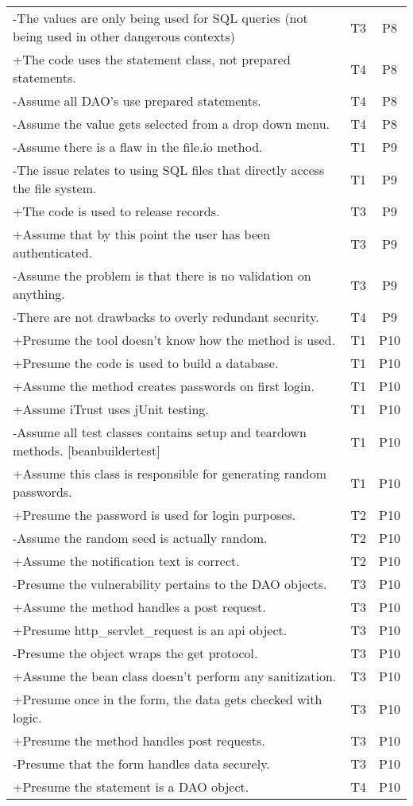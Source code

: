 \documentclass[10pt,journal,compsoc]{IEEEtran}
\begin{document}
\begin{table*}
\begin{tabularx}{\textwidth}{|X|c|c|}
		-The values are only being used for SQL queries (not being used in other dangerous contexts)	&	T3	&	P8	\\
		+The code uses the statement class, not prepared statements.	&	T4	&	P8	\\
		-Assume all DAO’s use prepared statements.	&	T4	&	P8	\\
		-Assume the value gets selected from a drop down menu.	&	T4	&	P8	\\
		-Assume there is a flaw in the file.io method. 	&	T1	&	P9	\\
		-The issue relates to using SQL files that directly access the file system.	&	T1	&	P9	\\
		+The code is used to release records.	&	T3	&	P9	\\
		+Assume that by this point the user has been authenticated.	&	T3	&	P9	\\
		-Assume the problem is that there is no validation on anything.	&	T3	&	P9	\\
		-There are not drawbacks to overly redundant security. 	&	T4	&	P9	\\
		+Presume the tool doesn’t know how the method is used.	&	T1	&	P10	\\
		+Presume the code is used to build a database.	&	T1	&	P10	\\
		+Assume the method creates passwords on first login.	&	T1	&	P10	\\
		+Assume iTrust uses jUnit testing.	&	T1	&	P10	\\
		-Assume all test classes contains setup and teardown methods. [beanbuildertest]	&	T1	&	P10	\\
		+Assume this class is responsible for generating random passwords.	&	T1	&	P10	\\
		+Presume the password is used for login purposes.	&	T2	&	P10	\\
		-Assume the random seed is actually random.	&	T2	&	P10	\\
		+Assume the notification text is correct.	&	T2	&	P10	\\
		-Presume the vulnerability pertains to the DAO objects.	&	T3	&	P10	\\
		+Assume the method handles a post request.	&	T3	&	P10	\\
		+Presume http\_servlet\_request is an api object.	&	T3	&	P10	\\
		-Presume the object wraps the get protocol.	&	T3	&	P10	\\
		+Assume the bean class doesn’t perform any sanitization. 	&	T3	&	P10	\\
		+Presume once in the form, the data gets checked with logic.	&	T3	&	P10	\\
		+Presume the method handles post requests.	&	T3	&	P10	\\
		-Presume that the form handles data securely.	&	T3	&	P10	\\
		+Presume the statement is a DAO object.	&	T4	&	P10	\\
		\hline
	\end{tabularx}
\end{table*}
\end{document}

